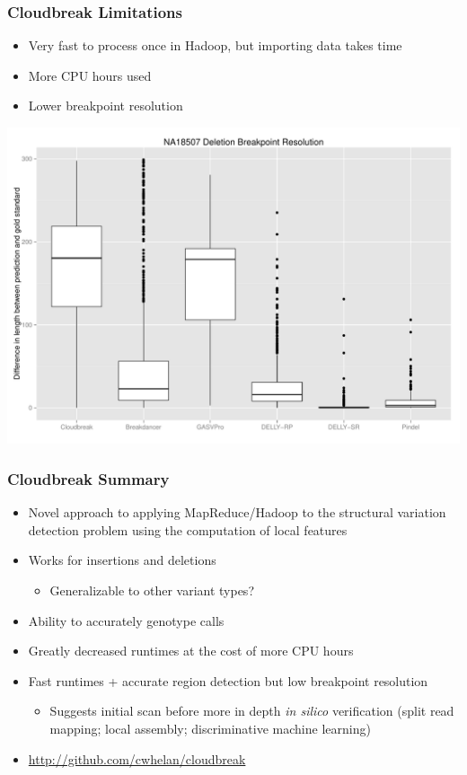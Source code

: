 \documentclass{beamer}
\begin{document}
\begin{frame}
  \frametitle{Cloudbreak Limitations}
  \begin{itemize}    
    \item Very fast to process once in Hadoop, but importing data takes time
    \item More CPU hours used
    \item Lower breakpoint resolution   
  \end{itemize}
  \begin{center}
  \includegraphics[scale=0.35]{breakpointResolutionNA18507.pdf}
  \end{center}
\end{frame}

\begin{frame}
  \frametitle{Cloudbreak Summary}
  \begin{itemize}
  \item Novel approach to applying MapReduce/Hadoop to the structural
    variation detection problem using the computation of local features
  \item Works for insertions and deletions
    \begin{itemize}
    \item Generalizable to other variant types?
    \end{itemize}
  \item Ability to accurately genotype calls
  \item Greatly decreased runtimes at the cost of more CPU hours
  \item Fast runtimes + accurate region detection but low breakpoint resolution
  \begin{itemize}
    \item Suggests initial scan before
      more in depth \emph{in silico} verification (split read mapping; local assembly;
      discriminative machine learning)
  \end{itemize}
  \item \url{http://github.com/cwhelan/cloudbreak}
  \end{itemize}
\end{frame}
\end{document}

